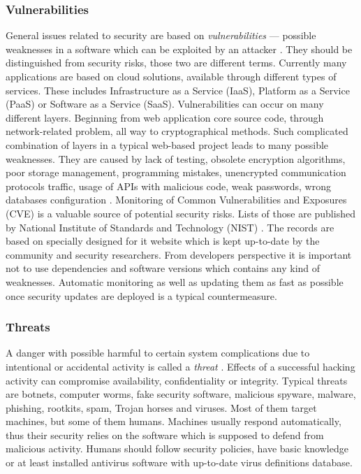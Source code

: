 \documentclass{article} %
\begin{document}
\subsubsection{Vulnerabilities}
General issues related to security are based on \textit{vulnerabilities} --- possible weaknesses in a software which can be exploited by an attacker \cite{bib:vulnerability_fsecure}. They should be distinguished from security risks, those two are different terms. Currently many applications are based on cloud solutions, available through different types of services. These includes Infrastructure as a Service (IaaS), Platform as a Service (PaaS) or Software as a Service (SaaS). Vulnerabilities can occur on many different layers. Beginning from web application core source code, through network-related problem, all way to cryptographical methods. Such complicated combination of layers in a typical web-based project leads to many possible weaknesses. They are caused by lack of testing, obsolete encryption algorithms, poor storage management, programming mistakes, unencrypted communication protocols traffic, usage of APIs with malicious code, weak passwords, wrong databases configuration \cite{bib:cloud_vulnerabilities}. Monitoring of Common Vulnerabilities and Exposures (CVE) is a valuable source of potential security risks. Lists of those are published by National Institute of Standards and Technology (NIST) \cite{bib:nist_list}. The records are based on specially designed for it website \cite{bib:cve_website} which is kept up-to-date by the community and security researchers. From developers perspective it is important not to use dependencies and software versions which contains any kind of weaknesses. Automatic monitoring as well as updating them as fast as possible once security updates are deployed is a typical countermeasure.
\subsubsection{Threats}
A danger with possible harmful to certain system complications due to intentional or accidental activity is called a \textit{threat} \cite{bib:thomas}. Effects of a successful hacking activity can compromise availability, confidentiality or integrity. Typical threats are botnets, computer worms, fake security software, malicious spyware, malware, phishing, rootkits, spam, Trojan horses and viruses. Most of them target machines, but some of them humans. Machines usually respond automatically, thus their security relies on the software which is supposed to defend from malicious activity. Humans should follow security policies, have basic knowledge or at least installed antivirus software with up-to-date virus definitions database.
\end{document}
